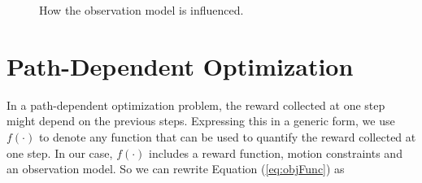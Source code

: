 \documentclass[12pt]{article}
\begin{document}
\begin{figure} 
  \centering 
  \caption{How the observation model is influenced.}
  \label{fig:factorsOnObs} %
\end{figure}

\section{Path-Dependent Optimization}

In a path-dependent optimization problem, the reward collected at one step might depend on the previous steps. Expressing this in a generic form, we use $ f(\cdot) $ to denote any function that can be used to quantify the reward collected at one step. In our case, $ f(\cdot) $ includes a reward function, motion constraints and an observation model. So we can rewrite Equation (\ref{eq:objFunc}) as 
\end{document}
